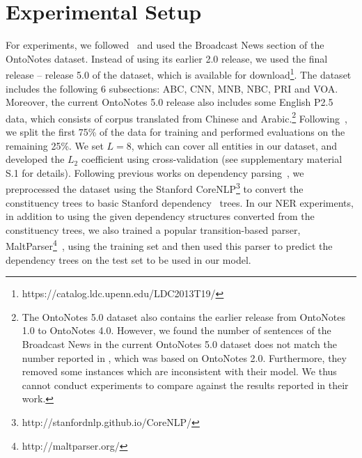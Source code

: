 \section{Experimental Setup}
For experiments, we followed~\cite{finkel2009joint} and used the Broadcast News section of the OntoNotes dataset.
Instead of using its earlier 2.0 release, we used the final release --  release 5.0 of the dataset, which is available for download\footnote{https://catalog.ldc.upenn.edu/LDC2013T19/}.
The dataset includes the following 6 subsections: ABC, CNN, MNB, NBC, PRI and VOA. 
Moreover, the current OntoNotes 5.0 release also includes some English P2.5 data, which consists of corpus translated from Chinese and Arabic.\footnote{The OntoNotes 5.0 dataset also contains the earlier release from OntoNotes 1.0 to OntoNotes 4.0. However, we found the number of sentences of the Broadcast News in the current OntoNotes 5.0 dataset does not match the number reported in \cite{finkel2009joint,finkel2010hierarchical}, which was based on OntoNotes 2.0. Furthermore, they removed some instances which are inconsistent with their model. We thus cannot conduct experiments to compare against the results reported in their work.}
Following~\cite{finkel2009joint}, we split the first 75\% of the data for training and performed evaluations on the remaining 25\%.
We set $L=8$, which can cover all entities in our dataset, and developed the $L_2$ coefficient using cross-validation (see supplementary material S.1 for details). 
Following previous works on dependency parsing~\cite{chen2014fast}, we preprocessed the dataset using the Stanford CoreNLP\footnote{http://stanfordnlp.github.io/CoreNLP/} to convert the constituency trees to basic Stanford dependency~\cite{de2006generating} trees. 
In our NER experiments, in addition to using the given dependency structures converted from the constituency trees, we also trained a popular transition-based parser, MaltParser\footnote{http://maltparser.org/}~\cite{nivre2006maltparser}, using the training set and then used this parser to predict the dependency trees on the test set to be used in our model. 
%





